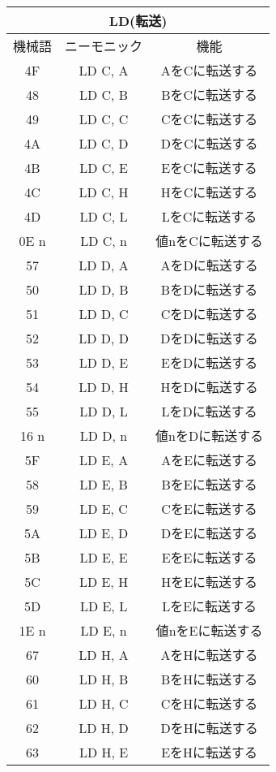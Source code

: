 \begin{center}
\begin{tabular}{|c|c|c|}
\hline
\multicolumn{3}{|c|}{LD(転送)}\\
\hline
機械語& ニーモニック& 機能 \\ \hline
4F& LD C, A & AをCに転送する  \\ \hline
48& LD C, B & BをCに転送する  \\ \hline
49& LD C, C & CをCに転送する  \\ \hline
4A& LD C, D & DをCに転送する  \\ \hline
4B& LD C, E & EをCに転送する  \\ \hline
4C& LD C, H & HをCに転送する  \\ \hline
4D& LD C, L & LをCに転送する  \\ \hline
0E n& LD C, n & 値nをCに転送する  \\ \hline
57& LD D, A & AをDに転送する  \\ \hline
50& LD D, B & BをDに転送する  \\ \hline
51& LD D, C & CをDに転送する  \\ \hline
52& LD D, D & DをDに転送する  \\ \hline
53& LD D, E & EをDに転送する  \\ \hline
54& LD D, H & HをDに転送する  \\ \hline
55& LD D, L & LをDに転送する  \\ \hline
16 n& LD D, n & 値nをDに転送する  \\ \hline
5F& LD E, A & AをEに転送する  \\ \hline
58& LD E, B & BをEに転送する  \\ \hline
59& LD E, C & CをEに転送する  \\ \hline
5A& LD E, D & DをEに転送する  \\ \hline
5B& LD E, E & EをEに転送する  \\ \hline
5C& LD E, H & HをEに転送する  \\ \hline
5D& LD E, L & LをEに転送する  \\ \hline
1E n& LD E, n & 値nをEに転送する  \\ \hline
67& LD H, A & AをHに転送する  \\ \hline
60& LD H, B & BをHに転送する  \\ \hline
61& LD H, C & CをHに転送する  \\ \hline
62& LD H, D & DをHに転送する  \\ \hline
63& LD H, E & EをHに転送する  \\ \hline

\end{tabular}
\end{center}
